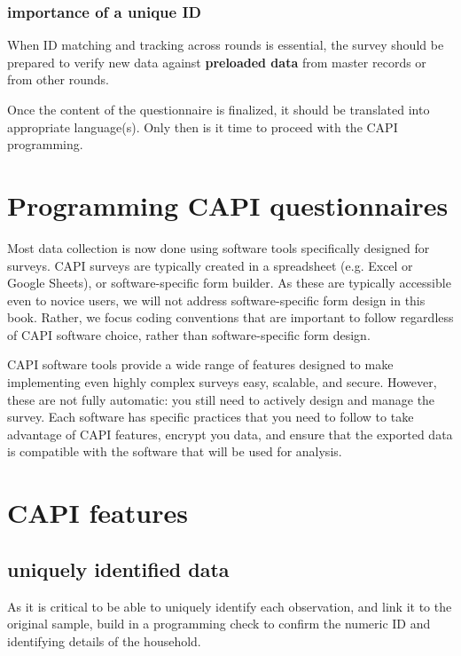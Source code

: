 \subsubsection{importance of a unique ID}
When ID matching and tracking across rounds is essential, the survey should be prepared to verify new data
against \textbf{preloaded data} from master records or from other rounds.


Once the content of the questionnaire is finalized, it should be translated into appropriate language(s). Only then is it time to proceed with the CAPI programming.



\section{Programming CAPI questionnaires}

Most data collection is now done using software tools specifically designed for surveys. CAPI surveys
are typically created in a spreadsheet (e.g. Excel or Google Sheets), or software-specific form builder. As these are typically accessible even to novice users, we will not address software-specific form design in this book. Rather, we focus coding conventions that are important to follow regardless of CAPI software choice, rather than software-specific form design. 

CAPI software tools provide a wide range of features designed to make implementing even highly complex surveys easy, scalable, and secure. However, these are not fully automatic: you still need to actively design and manage the survey. Each software has specific practices that you need to follow to take advantage of CAPI features, encrypt you data, and ensure that the exported data is compatible with the software that will be used for analysis. 

\section{CAPI features}
\subsection{uniquely identified data}
As it is critical to be able to uniquely identify each observation, and link it to the original sample, build in a programming check to confirm the numeric ID and identifying details of the household. 

